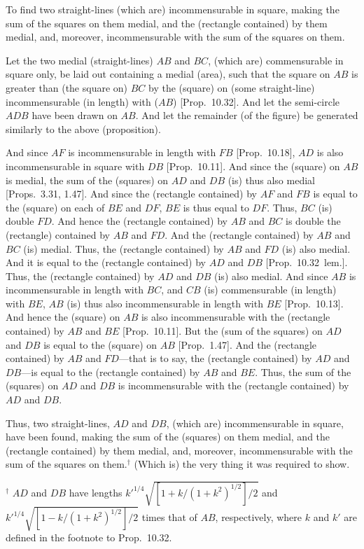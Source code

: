 \begin{Parallel}{}{}
{To find two straight-lines (which are) incommensurable in square, making the sum of the squares on them medial,
and the (rectangle contained) by them medial, and, moreover,
incommensurable  with the sum of the squares on them.

\centerline{}

Let the two medial (straight-lines) $AB$ and $BC$, (which are) commensurable in square only, be laid out containing a medial (area), such
that the square on $AB$ is greater than (the square on) $BC$ by the
(square) on (some straight-line) incommensurable (in length) with ($AB$) [Prop.~10.32].  And let the semi-circle
$ADB$ have been drawn on $AB$. And let the remainder (of the figure)
be generated similarly to the above (proposition).

And since $AF$ is incommensurable in length with $FB$ [Prop.~10.18], $AD$
is also incommensurable in square with $DB$ [Prop.~10.11]. And since the (square) on $AB$ is
medial, the sum of the (squares) on $AD$ and $DB$ (is) thus also
medial [Props.~3.31, 1.47]. And since the (rectangle
contained) by $AF$ and $FB$ is equal to the (square) on each of $BE$ and
$DF$, $BE$ is thus equal to $DF$. Thus, $BC$ (is) double $FD$. And
hence the (rectangle contained) by $AB$ and $BC$ is double the
(rectangle) contained by $AB$ and $FD$. And the (rectangle contained)
by $AB$ and $BC$ (is) medial. Thus, the (rectangle contained) by $AB$
and $FD$ (is) also medial. And it is equal to the (rectangle contained) 
by $AD$ and $DB$ [Prop.~10.32~lem.]. Thus, the
(rectangle contained) by $AD$ and $DB$ (is) also medial.
And since $AB$ is incommensurable in length with $BC$, and $CB$
(is) commensurable (in length) with $BE$, $AB$ (is) thus also incommensurable
in length with $BE$ [Prop.~10.13]. And hence the (square) on $AB$ is also incommensurable with the (rectangle contained) by $AB$ and $BE$ [Prop.~10.11]. But the (sum of the squares) on $AD$ and
$DB$ is equal to the (square) on $AB$ [Prop.~1.47].
And the (rectangle contained) by $AB$ and $FD$---that is to say, the (rectangle contained) by $AD$ and $DB$---is equal to the
(rectangle contained) by $AB$ and $BE$. Thus, the sum of the (squares) on
$AD$ and $DB$ is incommensurable with the (rectangle contained) by
$AD$ and $DB$.

Thus, two straight-lines, $AD$ and $DB$, (which are) incommensurable
in square, have been found, making the sum of the (squares) on them
medial, and the (rectangle contained) by them medial, and, moreover, 
incommensurable  with the sum of the squares on them.$^\dag$
 (Which is) the
very thing it was required to show.}
\end{Parallel}
{\footnotesize\noindent$^\dag$ $AD$ and $DB$ have lengths
$k'^{1/4}\sqrt{[1+k/(1+k^2)^{1/2}]/2}$ and  $k'^{1/4}\sqrt{[1-k/(1+k^2)^{1/2}]/2}$ times that of $AB$, respectively, where $k$ and $k'$
are defined in the footnote to Prop.~10.32.}

